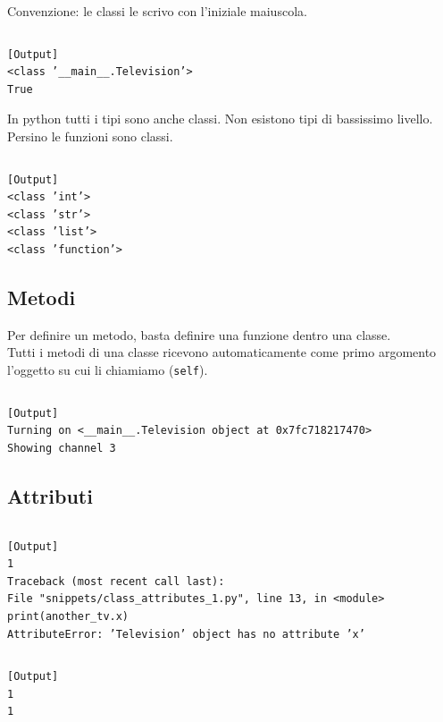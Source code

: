 Convenzione: le classi le scrivo con l'iniziale maiuscola.\\


\inputminted{python}{snippets/class_tv_basic.py}

\begin{verbatim}
[Output]
<class ’__main__.Television’>
True

\end{verbatim}

In python tutti i tipi sono anche classi. Non esistono tipi di bassissimo livello.\\
Persino le funzioni sono classi.

\inputminted{python}{snippets/everything_is_a_class.py}

\begin{verbatim}
[Output]
<class ’int’>
<class ’str’>
<class ’list’>
<class ’function’>
\end{verbatim}


\subsection{Metodi}
Per definire un metodo, basta definire una funzione dentro una classe.\\
Tutti i metodi di una classe ricevono automaticamente come primo argomento l'oggetto su cui li chiamiamo (\texttt{self}).\\

\inputminted{python}{snippets/class_methods.py}

\begin{verbatim}
[Output]
Turning on <__main__.Television object at 0x7fc718217470>
Showing channel 3
\end{verbatim}

\subsection{Attributi}


\inputminted{python}{snippets/class_attributes_1.py}

\begin{verbatim}
[Output]
1
Traceback (most recent call last):
File "snippets/class_attributes_1.py", line 13, in <module>
print(another_tv.x)
AttributeError: ’Television’ object has no attribute ’x’
\end{verbatim}

\inputminted{python}{snippets/class_attributes_2.py}

\begin{verbatim}
[Output]
1
1
\end{verbatim}

